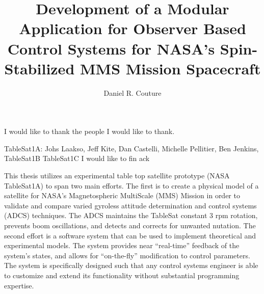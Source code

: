 \documentclass[11pt,doublespace]{unhthesis}
\begin{document}
\title{Development of a Modular Application for Observer Based Control Systems for NASA's Spin-Stabilized MMS Mission Spacecraft}
\author{Daniel R. Couture}
\maketitle

\makecopyright

\makeapproval

\begin{dedication}
  I would like to thank the people I would like to thank.
\end{dedication}

\begin{acknowledgments}
  TableSat1A: Johs Laakso, Jeff Kite, Dan Castelli, Michelle Pellitier, Ben Jenkins,
  TableSat1B
  TableSat1C
    I would like to fin ack
\end{acknowledgments}

\begin{singlespace}
  \tableofcontents
  \listoftables
  \listoffigures
\end{singlespace}

\begin{abstractpage}
This thesis utilizes an experimental table top satellite prototype (NASA TableSat1A) to span two main efforts.  The first is to create a physical model of a satellite for NASA's Magnetospheric MultiScale (MMS) Mission in order to validate and compare varied gyroless attitude determination and control systems (ADCS) techniques.  The ADCS maintains the TableSat constant 3 rpm rotation, prevents boom oscillations, and detects and corrects for unwanted nutation.  The second effort is a software system that can be used to implement theoretical and experimental models.  The system provides near ``real-time'' feedback of the system's states, and allows for ``on-the-fly'' modification to control parameters.  The system is specifically designed such that any control systems engineer is able to customize and extend its functionality without substantial programming expertise.
\end{abstractpage}
\end{document}
